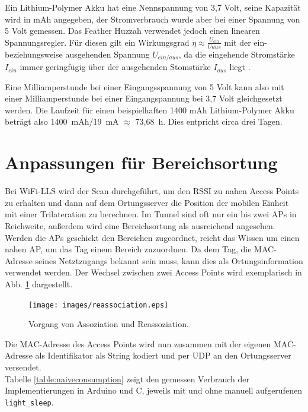 Ein Lithium-Polymer Akku hat eine Nennspannung von 3,7 Volt, seine Kapazität wird in mAh angegeben, der Stromverbrauch wurde aber bei einer Spannung von 5 Volt gemessen. 
Das Feather Huzzah verwendet jedoch einen linearen Spannungsregler.
Für diesen gilt ein Wirkungsgrad $\eta \approx \frac{U_{ein}}{U{aus}}$ mit der ein- beziehungsweise ausgehenden Spannung $U_{ein/aus}$, da die eingehende Stromstärke $I_{ein}$ immer geringfügig über der ausgehenden Stomstärke $I_{aus}$ liegt \cite{streichert2012elektrik}.


Eine Milliamperstunde bei einer Eingangsspannung von 5 Volt kann also mit einer Milliamperstunde bei einer Eingangspannung bei 3,7 Volt gleichgesetzt werden.
Die Laufzeit für einen beispielhaften 1400 mAh Lithium-Polymer Akku beträgt also 1400\ mAh/19\ mA $\approx$ 73,68\ h.
Dies entpricht circa drei Tagen.


\section{Anpassungen für Bereichsortung}
\label{ch:phase1:sec:anpassungbereich}
Bei WiFi-LLS wird der Scan durchgeführt, um den RSSI zu nahen Access Points zu erhalten und dann auf dem Ortungsserver die Position der mobilen Einheit mit einer Trilateration zu berechnen.
Im Tunnel sind oft nur ein bis zwei APs in Reichweite, außerdem wird eine Bereichsortung als ausreichend angesehen. \\
Werden die APs geschickt den Bereichen zugeordnet, reicht das Wissen um einen nahen AP, um das Tag einem Bereich zuzuordnen.
Da dem Tag, die MAC-Adresse seines Netztzugangs bekannt sein muss, kann dies als Ortungsinformation verwendet werden.
Der Wechsel zwischen zwei Access Points wird exemplarisch in Abb. \ref{fig:reassociation} dargestellt.

\begin{figure}[h!]
  \centering
	\texttt{[image: images/reassociation.eps]}
  \caption{Vorgang von Assoziation und Reassoziation.}
  \label{fig:reassociation}
\end{figure}

Die MAC-Adresse des Access Points wird nun zusammen mit der eigenen MAC-Adresse als Identifikator als String kodiert und per UDP an den Ortungsserver versendet.\\
Tabelle \ref{table:naiveconsumption} zeigt den gemessen Verbrauch der Implementierungen in Arduino und C, jeweils mit und ohne manuell aufgerufenen \texttt{light\_sleep}.

